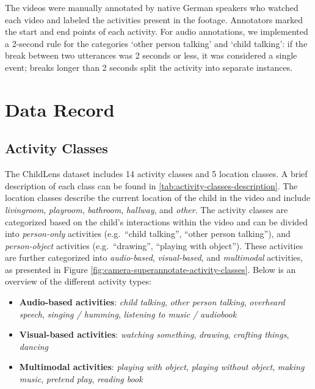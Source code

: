 \documentclass[
  man,floatsintext]{apa6}
\providecommand{\tightlist}{%
  \setlength{\itemsep}{0pt}\setlength{\parskip}{0pt}}
\begin{document}
The videos were manually annotated by native German speakers who watched each video and labeled the activities present in the footage. Annotators marked the start and end points of each activity. For audio annotations, we implemented a 2-second rule for the categories `other person talking' and `child talking': if the break between two utterances was 2 seconds or less, it was considered a single event; breaks longer than 2 seconds split the activity into separate instances.

\section{Data Record}\label{data-record}

\subsection{Activity Classes}\label{activity-classes}

The ChildLens dataset includes 14 activity classes and 5 location classes. A brief description of each class can be found in \ref{tab:activity-classes-description}. The location classes describe the current location of the child in the video and include \emph{livingroom}, \emph{playroom}, \emph{bathroom}, \emph{hallway}, and \emph{other}.
The activity classes are categorized based on the child's interactions within the video and can be divided into \emph{person-only} activities (e.g.~``child talking'', ``other person talking''), and \emph{person-object} activities (e.g.~``drawing'', ``playing with object''). These activities are further categorized into \emph{audio-based}, \emph{visual-based}, and \emph{multimodal} activities, as presented in Figure \ref{fig:camera-superannotate-activity-classes}. Below is an overview of the different activity types:

\begin{itemize}
\tightlist
\item
  \textbf{Audio-based activities}: \emph{child talking}, \emph{other person talking}, \emph{overheard speech}, \emph{singing / humming}, \emph{listening to music / audiobook}
\item
  \textbf{Visual-based activities}: \emph{watching something}, \emph{drawing}, \emph{crafting things}, \emph{dancing}
\item
  \textbf{Multimodal activities}: \emph{playing with object}, \emph{playing without object}, \emph{making music}, \emph{pretend play}, \emph{reading book}
\end{itemize}
\end{document}
